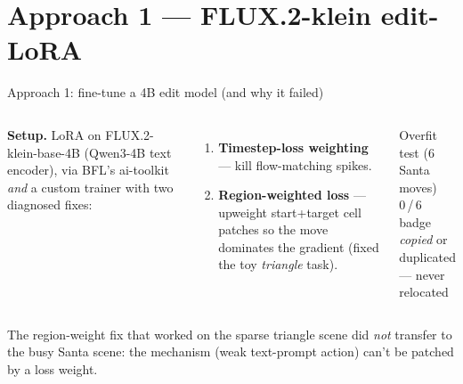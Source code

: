 \documentclass[aspectratio=169,11pt]{beamer}
\begin{document}
\section{Approach 1 --- FLUX.2-klein edit-LoRA}
\begin{frame}{Approach 1: fine-tune a 4B edit model (and why it failed)}
  \begin{columns}[T]
      \textbf{Setup.} LoRA on FLUX.2-klein-base-4B (Qwen3-4B text encoder),
      via BFL's ai-toolkit \emph{and} a custom trainer with two diagnosed fixes:
      \begin{enumerate}
        \item \textbf{Timestep-loss weighting} --- kill flow-matching spikes.
        \item \textbf{Region-weighted loss} --- upweight start+target cell patches
              so the move dominates the gradient (fixed the toy \emph{triangle} task).
      \end{enumerate}
      \centering
      \begin{block}{Overfit test (6 Santa moves)}
        \centering
        {\Huge \textcolor{ink}{0\,/\,6}}\\[0.3em]
        \footnotesize badge \emph{copied} or \alert{duplicated}\\ --- never relocated
      \end{block}
  \end{columns}
  \vspace{0.6em}
  \footnotesize The region-weight fix that worked on the sparse triangle scene
  did \emph{not} transfer to the busy Santa scene: the mechanism (weak
  text-prompt action) can't be patched by a loss weight.
\end{frame}

\end{document}
